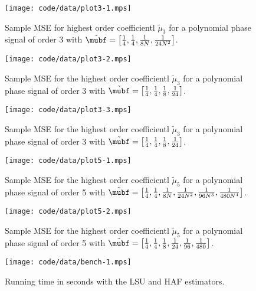 \documentclass[journal]{IEEEtran}
\begin{document}
 
\begin{figure}[p] 
   	\centering 
  		\texttt{[image: code/data/plot3-1.mps]} 
  		\caption{Sample MSE for highest order coefficientl $\tilde{\mu}_3$ for a polynomial phase signal of order 3 with $\tilde{\mubf} = \left[ \tfrac{1}{4}, \tfrac{1}{4}, \tfrac{1}{8N}, \tfrac{1}{24N^2}  \right]$.} 
  		\label{plot:m3small} 
 \end{figure} 

\begin{figure}[p] 
   	\centering 
  		\texttt{[image: code/data/plot3-2.mps]} 
  		\caption{Sample MSE for the highest order coefficientl $\tilde{\mu}_3$ for a polynomial phase signal of order 3 with $\tilde{\mubf} = \left[ \tfrac{1}{4}, \tfrac{1}{4}, \tfrac{1}{8}, \tfrac{1}{24}  \right]$.} 
  		\label{plot:m3big} 
 \end{figure} 

\begin{figure}[p] 
   	\centering 
  		\texttt{[image: code/data/plot3-3.mps]} 
  		\caption{Sample MSE for the highest order coefficientl $\tilde{\mu}_3$ for a polynomial phase signal of order 3 with $\tilde{\mubf} = \left[ \tfrac{1}{4}, \tfrac{1}{4}, \tfrac{1}{8}, \tfrac{1}{24}  \right]$.} 
  		\label{plot:m3bigzw} 
 \end{figure} 

\begin{figure}[p] 
   	\centering 
  		\texttt{[image: code/data/plot5-1.mps]} 
  		\caption{Sample MSE for the highest order coefficientl $\tilde{\mu}_5$ for a polynomial phase signal of order 5 with $\tilde{\mubf} = \left[ \tfrac{1}{4}, \tfrac{1}{4}, \tfrac{1}{8N}, \tfrac{1}{24N^2}, \tfrac{1}{96N^3}, \tfrac{1}{480N^4}   \right]$.} 
  		\label{plot:m5} 
\end{figure} 

\begin{figure}[p] 
   	\centering 
  		\texttt{[image: code/data/plot5-2.mps]} 
  		\caption{Sample MSE for the highest order coefficientl $\tilde{\mu}_5$ for a polynomial phase signal of order 5 with $\tilde{\mubf} = \left[ \tfrac{1}{4}, \tfrac{1}{4}, \tfrac{1}{8}, \tfrac{1}{24}, \tfrac{1}{96}, \tfrac{1}{480}   \right]$.} 
  		\label{plot:m5} 
\end{figure} 

\begin{figure}[p] 
   	\centering 
  		\texttt{[image: code/data/bench-1.mps]} 
  		\caption{Running time in seconds with the LSU and HAF estimators.} 
  		\label{plot:bench} 
\end{figure} 
\end{document}
